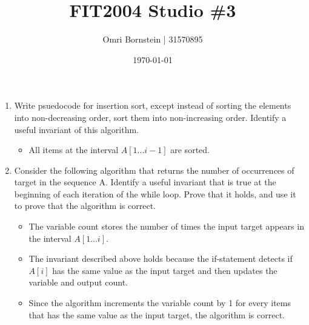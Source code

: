 \documentclass[11pt, a4paper, fleqn]{article}
\title{FIT2004 Studio \#3}
\date{\today}
\author{Omri Bornstein | 31570895}
\begin{document}
    \maketitle
    \begin{enumerate}
        \item Write psuedocode for insertion sort, except instead of sorting the elements into non-decreasing order, sort them into non-increasing order. Identify a useful invariant of this algorithm.
        \begin{itemize}
            \begin{lstlisting}
                function INSERTION_SORT(A[1..n])
                    i = 2
                    while i <= n do
                        key = A[i]
                        j = i - 1
                        while j >= 0 and key > A[j]:
                            A[j + 1] = A[j]
                            j = j - 1
                        end while
                        i = i + 1
                    end while
                end function
            \end{lstlisting}
            \item All items at the interval $A[1...i-1]$ are sorted.
        \end{itemize}
        \item Consider the following algorithm that returns the number of occurrences of target in the sequence A. Identify a useful invariant that is true at the beginning of each iteration of the while loop. Prove that it holds, and use it to prove that the algorithm is correct.
        \begin{itemize}
            \begin{lstlisting}
                function COUNT(A[1..n], target)
                    count = 0
                    i = 1
                    while i <= n do
                        if A[i] = target then
                            count = count + 1
                        end if
                        i = i + 1
                    end while
                    return count
                end function
            \end{lstlisting}
            \item The variable count stores the number of times the input target appears in the interval $A[1...i]$.
            \item The invariant described above holds because the if-statement detects if $A[i]$ has the same value as the input target and then updates the variable and output count.
            \item Since the algorithm increments the variable count by 1 for every items that has the same value as the input target, the  algorithm is correct.
        \end{itemize}
    \end{enumerate}
\end{document}
